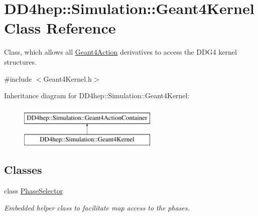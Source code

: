 \hypertarget{class_d_d4hep_1_1_simulation_1_1_geant4_kernel}{}\section{D\+D4hep\+:\+:Simulation\+:\+:Geant4\+Kernel Class Reference}
\label{class_d_d4hep_1_1_simulation_1_1_geant4_kernel}


Class, which allows all \hyperlink{class_d_d4hep_1_1_simulation_1_1_geant4_action}{Geant4\+Action} derivatives to access the D\+D\+G4 kernel structures.  




{\ttfamily \#include $<$Geant4\+Kernel.\+h$>$}

Inheritance diagram for D\+D4hep\+:\+:Simulation\+:\+:Geant4\+Kernel\+:\begin{figure}[H]
\begin{center}
\leavevmode
\includegraphics[height=2.000000cm]{class_d_d4hep_1_1_simulation_1_1_geant4_kernel}
\end{center}
\end{figure}
\subsection*{Classes}
\begin{DoxyCompactItemize}
\item 
class \hyperlink{class_d_d4hep_1_1_simulation_1_1_geant4_kernel_1_1_phase_selector}{Phase\+Selector}
\begin{DoxyCompactList}\small\item\em Embedded helper class to facilitate map access to the phases. \end{DoxyCompactList}\end{DoxyCompactItemize}
